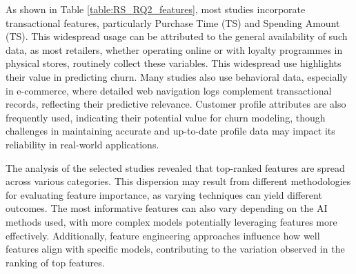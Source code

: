 \documentclass[preprint,12pt]{elsarticle}
\begin{document}
As shown in Table \ref{table:RS_RQ2_features}, most studies incorporate transactional features, particularly Purchase Time (TS) and Spending Amount (TS). This widespread usage can be attributed to the general availability of such data, as most retailers, whether operating online or with loyalty programmes in physical stores, routinely collect these variables. This widespread use highlights their value in predicting churn. 
Many studies also use behavioral data, especially in e-commerce, where detailed web navigation logs complement transactional records, reflecting their predictive relevance. Customer profile attributes are also frequently used, indicating their potential value for churn modeling, though challenges in maintaining accurate and up-to-date profile data may impact its reliability in real-world applications.

The analysis of the selected studies revealed that top-ranked features are spread across various categories. This dispersion may result from different methodologies for evaluating feature importance, as varying techniques can yield different outcomes. The most informative features can also vary depending on the AI methods used, with more complex models potentially leveraging features more effectively. Additionally, feature engineering approaches influence how well features align with specific models, contributing to the variation observed in the ranking of top features.
\end{document}
